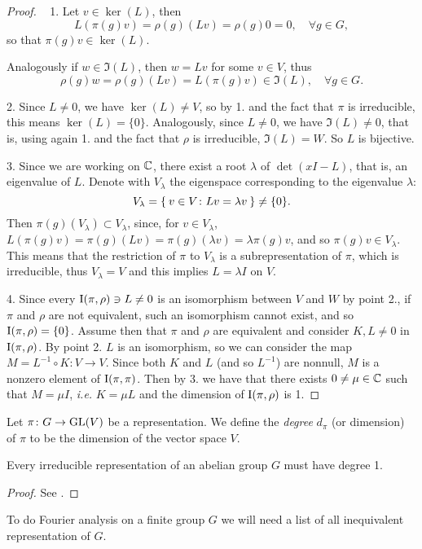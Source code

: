 \begin{proof}~
1. Let $v \in \ker(L)$, then 
\[
L(\pi(g)v)=\rho(g)(Lv)=\rho(g)0=0, \quad \forall g\in G,
\]
so that $\pi(g)v\in \ker(L)$.

Analogously if $w \in \Im(L)$, then $w=Lv$ for some $v\in V$, thus
\[
\rho(g)w=\rho(g)(Lv)=L(\pi(g)v)\in \Im(L), \quad \forall g\in G.
\]

2. Since $L\neq 0$, we have $\ker(L)\neq V$, so by 1. and the fact that $\pi$ is irreducible, this means $\ker(L)=\{0\}$. Analogously, since $L\neq 0$, we have $\Im(L)\neq 0$, that is, using again 1. and the fact that $\rho$ is irreducible, $\Im(L)=W$. So $L$ is bijective.

3. Since we are working on ${\mathbb C}$, there exist a root $\lambda$ of $\det(xI-L)$, that is, an eigenvalue of $L$. Denote with $V_\lambda$ the eigenspace corresponding to the eigenvalue $\lambda$:
\[
V_\lambda=\Set{v\in V \colon Lv=\lambda v}\neq \{0\}.
\] 
Then $\pi(g)(V_\lambda)\subset V_\lambda$, since, for $v\in V_\lambda$, $L(\pi(g)v)=\pi(g)(Lv)=\pi(g)(\lambda  v)=\lambda\pi(g) v$, and so $\pi(g)v\in V_\lambda$. This means that the restriction of $\pi$ to $V_\lambda$ is a subrepresentation of $\pi$, which is irreducible, thus $V_\lambda = V$ and this implies $L=\lambda I$ on $V$. 

4. Since every $\operatorname{I}(\pi,\rho)\ni L\neq 0$ is an isomorphism between $V$ and $W$ by point 2., if $\pi$ and $\rho$ are not equivalent, such an isomorphism cannot exist, and so $\operatorname{I}(\pi,\rho)=\{0\}$. Assume then that $\pi$ and $\rho$ are equivalent and consider $K,L\neq 0$ in  $\operatorname{I}(\pi,\rho)$. By point 2. $L$ is an isomorphism, so we can consider the map $M=L^{-1} \circ K\colon V\rightarrow V$. Since both $K$ and $L$ (and so $L^{-1}$) are nonnull, $M$ is a nonzero element of $\operatorname{I}(\pi,\pi)$. Then by 3. we have that there exists $0\neq \mu\in {\mathbb C}$ such that $M=\mu I$, \emph{i.e.} $K=\mu L$ and the dimension of $\operatorname{I}(\pi,\rho)$ is 1.
\end{proof}
\begin{defn}
Let $\pi\colon G \rightarrow \operatorname{GL}(V)$ be a representation. We define the \emph{degree} $d_{\pi}$ (or dimension) of $\pi$ to be the dimension of the vector space $V$.
\end{defn}
\begin{cor}
Every irreducible representation of an abelian group $G$ must have degree 1.
\end{cor}
\begin{proof}
See \cite[p. 249]{terras_1999}.
\end{proof}
To do Fourier analysis on a finite group $G$ we will need a list of all inequivalent representation of $G$.

